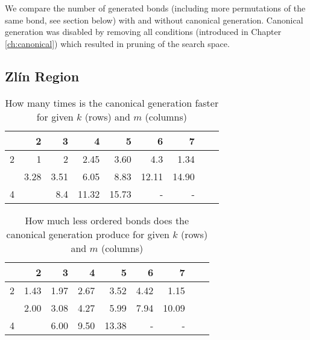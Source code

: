 We compare the number of generated bonds (including more permutations of the same bond, see section below) with and without canonical generation. Canonical generation was disabled by removing all conditions (introduced in Chapter \ref{ch:canonical}) which resulted in pruning of the search space.

\subsection*{Zlín Region}

\begin{table}[H]
	\caption{How many times is the canonical generation faster for given $k$ (rows) and $m$ (columns)}
	\centering
	\begin{tabular}{c|rrrrrrrr}

\toprule

         &         2 &         3 &         4 &         5 &         6 &         7 \\
\midrule
      2  &        1  &         2 &      2.45 &      3.60 &       4.3 &      1.34 \\
\evenrowcolor
      3  &      3.28 &      3.51 &      6.05 &      8.83 &     12.11 &     14.90 \\
      4  &           &       8.4 &     11.32 &     15.73 &         - &         - \\

	\end{tabular}
\end{table}

\begin{table}[H]
	\caption{How much less ordered bonds does the canonical generation produce for given $k$ (rows) and $m$ (columns)}
	\centering
	\begin{tabular}{c|rrrrrrrr}

\toprule

        &         2 &         3 &         4 &         5 &         6 &         7 \\ \midrule
     2  &      1.43 &      1.97 &      2.67 &      3.52 &      4.42 &      1.15 \\
\evenrowcolor
     3  &      2.00 &      3.08 &      4.27 &      5.99 &      7.94 &     10.09 \\
     4  &           &      6.00 &      9.50 &     13.38 &         - &         - \\


	\end{tabular}
\end{table}


